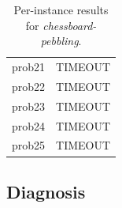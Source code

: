 \begin{table}[H]
{\begin{tabular}{lrrr rr rr rr rrrrr}
            prob21           & \multicolumn{14}{c}{TIMEOUT}                                                                                                                                  \\
            prob22           & \multicolumn{14}{c}{TIMEOUT}                                                                                                                                  \\
            prob23           & \multicolumn{14}{c}{TIMEOUT}                                                                                                                                  \\
            prob24           & \multicolumn{14}{c}{TIMEOUT}                                                                                                                                  \\
            prob25           & \multicolumn{14}{c}{TIMEOUT}                                                                                                                                  \\
            \bottomrule
        \end{tabular}%
    }
    \caption{Per-instance results for \textit{chessboard-pebbling}.}
    \label{tab:appendix_chesspebbling}
\end{table}

\subsection{Diagnosis}
\label{app:results_diagnosis}

